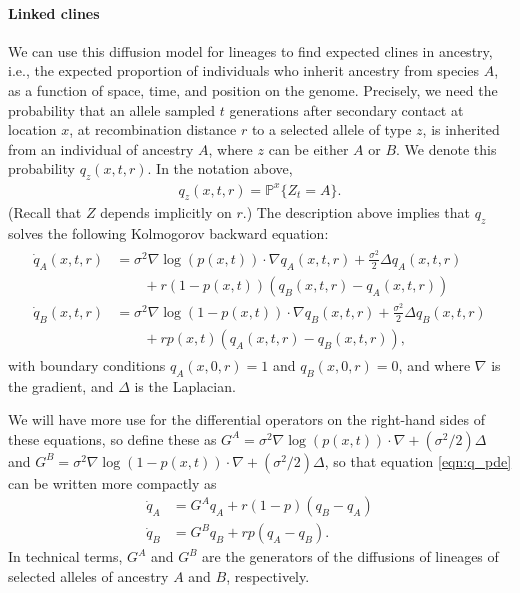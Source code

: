 \documentclass[11pt,letterpaper]{article}
\newcommand{\alisa}[1]{{\em \color{red} #1}}
\newcommand{\plr}[1]{{\em \color{blue} #1}}
\renewcommand{\P}{\mathbb{P}}
\newcommand{\grad}{\nabla}
\begin{document}
\paragraph{Linked clines}
We can use this diffusion model for lineages to find expected clines in ancestry,
i.e., the expected proportion of individuals who inherit ancestry from species $A$,
as a function of space, time, and position on the genome.
Precisely, we need the probability that 
an allele sampled $t$ generations after secondary contact at location $x$,
at recombination distance $r$ to a selected allele of type $z$,
is inherited from an individual of ancestry $A$,
where $z$ can be either $A$ or $B$.
We denote this probability $q_z(x,t,r)$.
In the notation above,
\begin{align}
    q_z(x,t,r) = \P^x \{Z_t = A\} .
\end{align}
(Recall that $Z$ depends implicitly on $r$.)
The description above implies that $q_z$ solves the following Kolmogorov backward equation:
\begin{align}
    \begin{aligned}  \label{eqn:q_pde}
    \dot q_A(x,t,r) 
            &= \sigma^2 \grad \log(p(x,t)) \cdot \grad q_A(x,t,r) 
                + \frac{\sigma^2}{2} \Delta q_A(x,t,r) 
            \\ &\qquad {} + 
                r (1-p(x,t))(q_B(x,t,r)-q_A(x,t,r))  \\
    \dot q_B(x,t,r) &= \sigma^2 \grad \log(1-p(x,t)) \cdot \grad q_B(x,t,r) 
            + \frac{\sigma^2}{2} \Delta q_B(x,t,r)
            \\ &\qquad {} + 
            r p(x,t) (q_A(x,t,r)-q_B(x,t,r))  ,
    \end{aligned} 
\end{align}
with boundary conditions $q_A(x,0,r)=1$ and $q_B(x,0,r)=0$, 
and where $\grad$ is the gradient, and $\Delta$ is the Laplacian.

We will have more use for the differential operators on the right-hand sides of these equations,
so define these as
$G^A = \sigma^2 \grad \log(p(x,t)) \cdot \grad + (\sigma^2/2) \Delta$
and
$G^B = \sigma^2 \grad \log(1-p(x,t)) \cdot \grad + (\sigma^2/2) \Delta$,
so that equation \eqref{eqn:q_pde} can be written more compactly as
\begin{align*}
    \dot q_A &= G^A q_A + r (1-p) (q_B-q_A) \\
    \dot q_B &= G^B q_B + r p (q_A-q_B) .
\end{align*}
In technical terms, $G^A$ and $G^B$ are the generators of the diffusions of lineages of selected alleles of ancestry $A$ and $B$, respectively.
\end{document}
